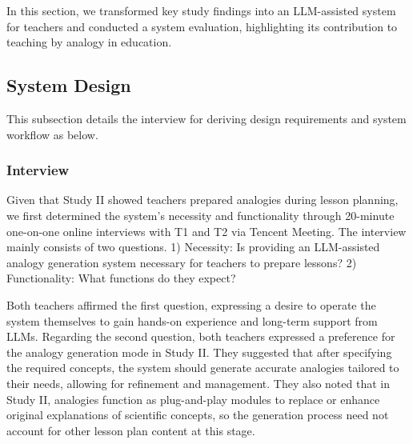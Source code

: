 In this section, we transformed key study findings into an LLM-assisted system for teachers and conducted a system evaluation, highlighting its contribution to teaching by analogy in education.

\subsection{System Design}
This subsection details the interview for deriving design requirements and system workflow as below.

\subsubsection{Interview}
Given that Study II showed teachers prepared analogies during lesson planning, we first determined the system's necessity and functionality through 20-minute one-on-one online interviews with T1 and T2 via Tencent Meeting. 
The interview mainly consists of two questions. 1) Necessity: Is providing an LLM-assisted analogy generation system necessary for teachers to prepare lessons? 2) Functionality: What functions do they expect?

Both teachers affirmed the first question, expressing a desire to operate the system themselves to gain hands-on experience and long-term support from LLMs.
Regarding the second question, both teachers expressed a preference for the analogy generation mode in Study II. 
They suggested that after specifying the required concepts, the system should generate accurate analogies tailored to their needs, allowing for refinement and management. 
They also noted that in Study II, analogies function as plug-and-play modules to replace or enhance original explanations of scientific concepts, so the generation process need not account for other lesson plan content at this stage.


